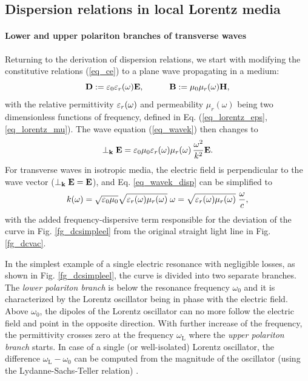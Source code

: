 \subsection{Dispersion relations in local Lorentz media} \label{disp_rel_local_media}
\paragraph{Lower and upper polariton branches of transverse waves} %
Returning to the derivation of dispersion relations, we start with modifying the constitutive relations (\ref{eq_ce}) to a plane wave propagating in a medium:
\begin{equation}		\mathbf{D} := \varepsilon_0\varepsilon_r(\omega)	\mathbf{E}, \quad\quad\quad						\mathbf{B} := \mu_0\mu_r(\omega)		\mathbf{H},				 \label{eq_ce2}\end{equation}
with the relative permittivity $\varepsilon_r(\omega)$ and permeability $\mu_r(\omega)$ being two dimensionless functions of frequency, defined in Eq. (\ref{eq_lorentz_eps}, \ref{eq_lorentz_mu}). 
The wave equation (\ref{eq_wavek}) then changes to
\begin{equation}  \perp_{\mathbf{k}}\mathbf{E} = \varepsilon_0 \mu_0  \varepsilon_r(\omega) \mu_r(\omega) \, \frac{ \omega^{2}}{k^2} \mathbf{E}.  \label{eq_wavek_disp}\end{equation}
For transverse waves in isotropic media, the electric field is perpendicular to the wave vector ($\perp_{\mathbf{k}}\mathbf{E} = \mathbf{E}$), and Eq. \ref{eq_wavek_disp} can be simplified to  
\begin{equation} k(\omega) = \sqrt{\varepsilon_0 \mu_0} \sqrt{\varepsilon_r(\omega) \mu_{r}(\omega)}\;\omega = \sqrt{\varepsilon_r(\omega) \mu_{r}(\omega)}\; \frac{\omega}{c}, \label{eq_dispeq_loc}\end{equation}
with the added frequency-dispersive term responsible for the deviation of the curve in Fig. \ref{fg_dcsimpleel} from the original straight light line in Fig. \ref{fg_dcvac}. 

In the simplest example of a single electric resonance with negligible losses, as shown in Fig. \ref{fg_dcsimpleel}, the curve is divided into two separate branches. The \textit{lower polariton branch} is below the resonance frequency $\omega_0$ and it is characterized by the Lorentz oscillator being in phase with the electric field. Above $\omega_0$, the dipoles of the Lorentz oscillator can no more follow the electric field and point in the opposite direction. With further increase of the frequency, the permittivity crosses zero at the frequency $\omega_{\text{L}}$ where the \textit{upper polariton branch} starts. In case of a single (or well-isolated) Lorentz oscillator, the difference $\omega_{\text{L}} - \omega_0$ can be computed from the magnitude of the oscillator (using the Lydanne-Sachs-Teller relation) \cite{klingshirn2007semiconductor}.

